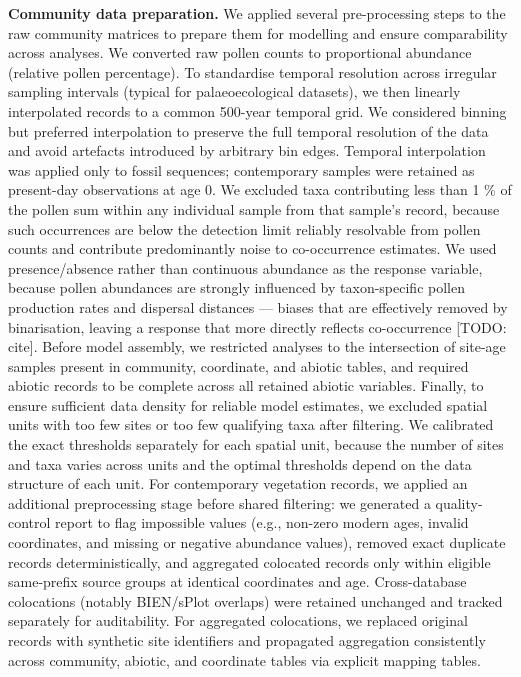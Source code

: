\documentclass[
  12pt,
]{article}
\begin{document}
\textbf{Community data preparation.} We applied several pre-processing
steps to the raw community matrices to prepare them for modelling and
ensure comparability across analyses. We converted raw pollen counts to
proportional abundance (relative pollen percentage). To standardise
temporal resolution across irregular sampling intervals (typical for
palaeoecological datasets), we then linearly interpolated records to a
common 500-year temporal grid. We considered binning but preferred
interpolation to preserve the full temporal resolution of the data and
avoid artefacts introduced by arbitrary bin edges. Temporal
interpolation was applied only to fossil sequences; contemporary samples
were retained as present-day observations at age 0. We excluded taxa
contributing less than 1 \% of the pollen sum within any individual
sample from that sample's record, because such occurrences are below the
detection limit reliably resolvable from pollen counts and contribute
predominantly noise to co-occurrence estimates. We used presence/absence
rather than continuous abundance as the response variable, because
pollen abundances are strongly influenced by taxon-specific pollen
production rates and dispersal distances --- biases that are effectively
removed by binarisation, leaving a response that more directly reflects
co-occurrence {[}TODO: cite{]}. Before model assembly, we restricted
analyses to the intersection of site-age samples present in community,
coordinate, and abiotic tables, and required abiotic records to be
complete across all retained abiotic variables. Finally, to ensure
sufficient data density for reliable model estimates, we excluded
spatial units with too few sites or too few qualifying taxa after
filtering. We calibrated the exact thresholds separately for each
spatial unit, because the number of sites and taxa varies across units
and the optimal thresholds depend on the data structure of each unit.
For contemporary vegetation records, we applied an additional
preprocessing stage before shared filtering: we generated a
quality-control report to flag impossible values (e.g., non-zero modern
ages, invalid coordinates, and missing or negative abundance values),
removed exact duplicate records deterministically, and aggregated
colocated records only within eligible same-prefix source groups at
identical coordinates and age. Cross-database colocations (notably
BIEN/sPlot overlaps) were retained unchanged and tracked separately for
auditability. For aggregated colocations, we replaced original records
with synthetic site identifiers and propagated aggregation consistently
across community, abiotic, and coordinate tables via explicit mapping
tables.
\end{document}
